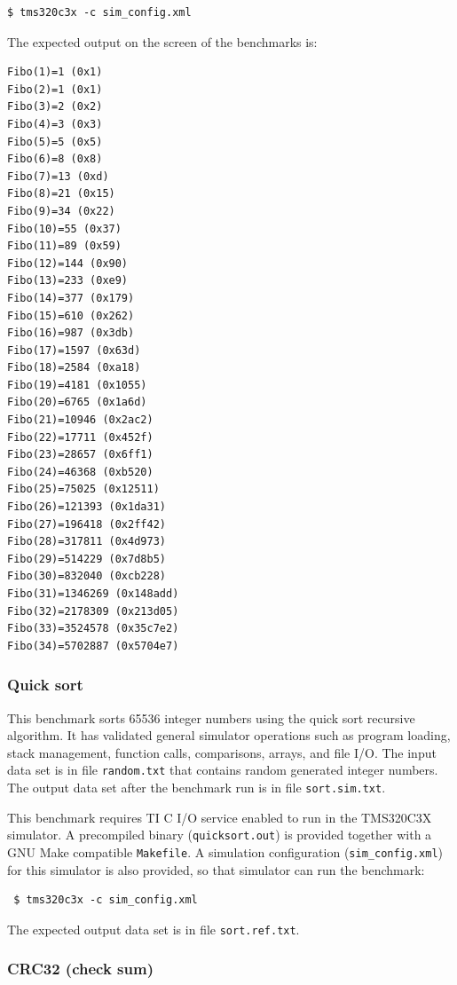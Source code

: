 \begin{verbatim}
$ tms320c3x -c sim_config.xml
\end{verbatim}

\noindent The expected output on the screen of the benchmarks is:

\begin{verbatim}
Fibo(1)=1 (0x1)
Fibo(2)=1 (0x1)
Fibo(3)=2 (0x2)
Fibo(4)=3 (0x3)
Fibo(5)=5 (0x5)
Fibo(6)=8 (0x8)
Fibo(7)=13 (0xd)
Fibo(8)=21 (0x15)
Fibo(9)=34 (0x22)
Fibo(10)=55 (0x37)
Fibo(11)=89 (0x59)
Fibo(12)=144 (0x90)
Fibo(13)=233 (0xe9)
Fibo(14)=377 (0x179)
Fibo(15)=610 (0x262)
Fibo(16)=987 (0x3db)
Fibo(17)=1597 (0x63d)
Fibo(18)=2584 (0xa18)
Fibo(19)=4181 (0x1055)
Fibo(20)=6765 (0x1a6d)
Fibo(21)=10946 (0x2ac2)
Fibo(22)=17711 (0x452f)
Fibo(23)=28657 (0x6ff1)
Fibo(24)=46368 (0xb520)
Fibo(25)=75025 (0x12511)
Fibo(26)=121393 (0x1da31)
Fibo(27)=196418 (0x2ff42)
Fibo(28)=317811 (0x4d973)
Fibo(29)=514229 (0x7d8b5)
Fibo(30)=832040 (0xcb228)
Fibo(31)=1346269 (0x148add)
Fibo(32)=2178309 (0x213d05)
Fibo(33)=3524578 (0x35c7e2)
Fibo(34)=5702887 (0x5704e7)
\end{verbatim}

\subsubsection{Quick sort}

This benchmark sorts 65536 integer numbers using the quick sort recursive algorithm.
It has validated general simulator operations such as program loading, stack management, function calls, comparisons, arrays, and file I/O.
The input data set is in file \texttt{random.txt} that contains random generated integer numbers.
The output data set after the benchmark run is in file \texttt{sort.sim.txt}.

This benchmark requires TI C I/O service enabled to run in the TMS320C3X simulator.
A precompiled binary (\texttt{quicksort.out}) is provided together with a GNU Make compatible \texttt{Makefile}.
A simulation configuration (\texttt{sim\_config.xml}) for this simulator is also provided, so that simulator can run the benchmark:

\begin{verbatim}
 $ tms320c3x -c sim_config.xml
\end{verbatim}

\noindent The expected output data set is in file \texttt{sort.ref.txt}.

\subsubsection{CRC32 (check sum)}

